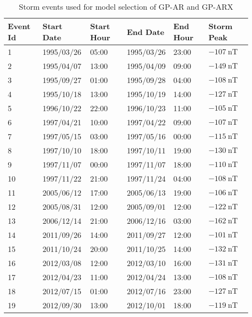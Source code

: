     
\begin{table}[ht]
    \centering
    \caption{Storm events used for model selection of GP-AR and GP-ARX}
    \label{table:validationstorms}
    \begin{tabular}{llllll}
    \hline
    \textbf{Event Id} & \textbf{Start Date} & \textbf{Start Hour} & \textbf{End Date} & \textbf{End Hour} & \textbf{Storm Peak} \\ \hline
    1 & 1995/03/26 & 05:00 & 1995/03/26 & 23:00 & $ \SI{-107}{\nano\tesla}$ \\
    2 & 1995/04/07 & 13:00 & 1995/04/09 & 09:00 & $ \SI{-149}{\nano\tesla}$ \\
    3 & 1995/09/27 & 01:00 & 1995/09/28 & 04:00 & $ \SI{-108}{\nano\tesla}$ \\
    4 & 1995/10/18 & 13:00 & 1995/10/19 & 14:00 & $ \SI{-127}{\nano\tesla}$ \\
    5 & 1996/10/22 & 22:00 & 1996/10/23 & 11:00 & $ \SI{-105}{\nano\tesla}$ \\
    6 & 1997/04/21 & 10:00 & 1997/04/22 & 09:00 & $ \SI{-107}{\nano\tesla}$ \\
    7 & 1997/05/15 & 03:00 & 1997/05/16 & 00:00 & $ \SI{-115}{\nano\tesla}$ \\
    8 & 1997/10/10 & 18:00 & 1997/10/11 & 19:00 & $ \SI{-130}{\nano\tesla}$ \\
    9 & 1997/11/07 & 00:00 & 1997/11/07 & 18:00 & $ \SI{-110}{\nano\tesla}$ \\
    10 & 1997/11/22 & 21:00 & 1997/11/24 & 04:00 & $ \SI{-108}{\nano\tesla}$ \\
    11 & 2005/06/12 & 17:00 & 2005/06/13 & 19:00 & $ \SI{-106}{\nano\tesla}$ \\
    12 & 2005/08/31 & 12:00 & 2005/09/01 & 12:00 & $ \SI{-122}{\nano\tesla}$ \\
    13 & 2006/12/14 & 21:00 & 2006/12/16 & 03:00 & $ \SI{-162}{\nano\tesla}$ \\
    14 & 2011/09/26 & 14:00 & 2011/09/27 & 12:00 & $ \SI{-101}{\nano\tesla}$ \\
    15 & 2011/10/24 & 20:00 & 2011/10/25 & 14:00 & $ \SI{-132}{\nano\tesla}$ \\
    16 & 2012/03/08 & 12:00 & 2012/03/10 & 16:00 & $ \SI{-131}{\nano\tesla}$ \\
    17 & 2012/04/23 & 11:00 & 2012/04/24 & 13:00 & $ \SI{-108}{\nano\tesla}$ \\
    18 & 2012/07/15 & 01:00 & 2012/07/16 & 23:00 & $ \SI{-127}{\nano\tesla}$ \\
    19 & 2012/09/30 & 13:00 & 2012/10/01 & 18:00 & $ \SI{-119}{\nano\tesla}$ \\

\end{tabular}
\end{table}
